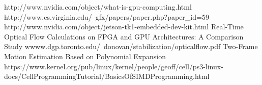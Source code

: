 \documentclass[12pt,letterpaper]{article}
\begin{document}
\begin{thebibliography}{10}
    http://www.nvidia.com/object/what-is-gpu-computing.html
    http://www.cs.virginia.edu/~gfx/papers/paper.php?paper\_id=59
    http://www.nvidia.com/object/jetson-tk1-embedded-dev-kit.html
    Real-Time Optical Flow Calculations on FPGA and GPU Architectures: A Comparison
    Study
    wwww.dgp.toronto.edu/~donovan/stabilization/opticalflow.pdf
    Two-Frame Motion Estimation Based on Polynomial Expansion
    https://www.kernel.org/pub/linux/kernel/people/geoff/cell/ps3-linux-docs/CellProgrammingTutorial/BasicsOfSIMDProgramming.html
\end{thebibliography}
\end{document}
